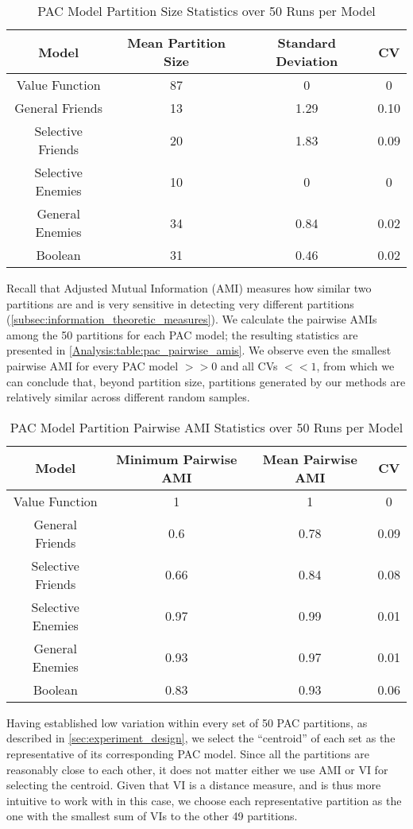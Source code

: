 \begin{table}[ht]
\centering
\begin{tabular}{|c|c|c|c|}
\hline
  Model & Mean Partition Size & Standard Deviation & CV \\ \hline
Value Function & 87 & 0 & 0 \\
General Friends & 13 & 1.29 & 0.10  \\
Selective Friends & 20 & 1.83 & 0.09  \\
Selective Enemies & 10 & 0 & 0 \\
General Enemies & 34 & 0.84 & 0.02 \\
Boolean & 31 & 0.46 & 0.02  \\
\hline
\end{tabular}
\caption{PAC Model Partition Size Statistics over 50 Runs per Model}
\label{Analysis:table:pac_num_coalitions}
\end{table}

Recall that Adjusted Mutual Information (AMI) measures how similar two
partitions are and is very sensitive in detecting very different partitions
(\autoref{subsec:information_theoretic_measures}).
We calculate the pairwise AMIs among the 50 partitions for each PAC model;
the resulting statistics are presented in \autoref{Analysis:table:pac_pairwise_amis}.
We observe even the smallest pairwise AMI for every PAC model $>> 0$ and all CVs
$<< 1$, from which we can conclude that, beyond partition size, partitions
generated by our methods are relatively similar across different random samples.

\begin{table}[ht]
\centering
\begin{tabular}{|c|c|c|c|}
\hline
  Model & Minimum Pairwise AMI & Mean Pairwise AMI & CV \\ \hline
Value Function & 1 & 1 & 0 \\
General Friends & 0.6 & 0.78 & 0.09  \\
Selective Friends & 0.66 & 0.84 & 0.08  \\
Selective Enemies & 0.97 & 0.99 & 0.01 \\
General Enemies & 0.93 & 0.97 & 0.01 \\
Boolean & 0.83 & 0.93 & 0.06  \\
\hline
\end{tabular}
\caption{PAC Model Partition Pairwise AMI Statistics over 50 Runs per Model}
\label{Analysis:table:pac_pairwise_amis}
\end{table}

Having established low variation within every set of 50
PAC partitions, as described in \autoref{sec:experiment_design}, we select
the ``centroid'' of each set as the representative of its corresponding PAC model.
Since all the partitions are reasonably close to each other, it does not
matter either we use AMI or VI for selecting the centroid.
Given that VI is a distance measure, and is thus more intuitive to work with in
this case, we choose each representative partition as the one with the smallest
sum of VIs to the other 49 partitions.

